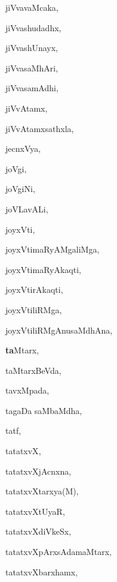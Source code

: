 \begin{multicols}{3}
{\noindent
{jiVvavaMcaka}, \pageref{jiVvavaMcaka}

\noindent
{jiVvashudadhx}, \pageref{jiVvashudadhx}

\noindent
{jiVvashUnayx}, \pageref{jiVvashUnayx}

\noindent
{jiVvasaMhAri}, \pageref{jiVvasaMhAri}

\noindent
{jiVvasamAdhi}, \pageref{jiVvasamAdhi}

\noindent
{jiVvAtamx}, \pageref{jiVvAtamx}

\noindent
{jiVvAtamxsathxla}, \pageref{jiVvAtamxsathxla}

\noindent
{jecnxVya}, \pageref{jecnxVya}

\noindent
{joVgi}, \pageref{joVgi}

\noindent
{joVgiNi}, \pageref{joVgiNi}

\noindent
{joVLavALi}, \pageref{joVLavALi}

\noindent
{joyxVti}, \pageref{joyxVti}

\noindent
{joyxVtimaRyAMgaliMga}, \pageref{joyxVtimaRyAMgaliMga}

\noindent
{joyxVtimaRyAkaqti}, \pageref{joyxVtimaRyAkaqti}

\noindent
{joyxVtirAkaqti}, \pageref{joyxVtirAkaqti}

\noindent
{joyxVtiliRMga}, \pageref{joyxVtiliRMga}

\noindent
{joyxVtiliRMgAnusaMdhAna}, \pageref{joyxVtiliRMgAnusaMdhAna}

\noindent
{{\large\textbf{ta}}Mtarx}, \pageref{taMtarx}

\noindent
{taMtarxBeVda}, \pageref{taMtarxBeVda}

\noindent
{tavxMpada}, \pageref{tavxMpada}

\noindent
{tagaDa saMbaMdha}, \pageref{tagaDa saMbaMdha}

\noindent
{tatf}, \pageref{tatf}

\noindent
{tatatxvX}, \pageref{tatatxvX}

\noindent
{tatatxvXjAcnxna}, \pageref{tatatxvXjAcnxna}

\noindent
{tatatxvXtarxya(M)}, \pageref{tatatxvXtarxya(M)}

\noindent
{tatatxvXtUyaR}, \pageref{tatatxvXtUyaR}

\noindent
{tatatxvXdiVkeSx}, \pageref{tatatxvXdiVkeSx}

\noindent
{tatatxvXpArxsAdamaMtarx}, \pageref{tatatxvXpArxsAdamaMtarx}

\noindent
{tatatxvXbarxhamx}, \pageref{tatatxvXbarxhamx}

}
\end{multicols}
